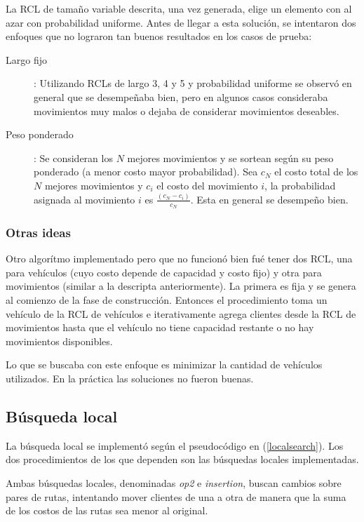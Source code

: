 \documentclass{article}
\begin{document}
  La RCL de tamaño variable descrita, una vez generada, elige un elemento con al azar con probabilidad uniforme. Antes de llegar a esta solución, se intentaron dos enfoques que no lograron tan buenos resultados en los casos de prueba:
  \begin{description}
    \item[Largo fijo]: Utilizando RCLs de largo 3, 4 y 5 y probabilidad uniforme se observó en general que se desempeñaba bien, pero en algunos casos consideraba movimientos muy malos o dejaba de considerar movimientos deseables.
    \item[Peso ponderado]: Se consideran los $N$ mejores movimientos y se sortean según su peso ponderado (a menor costo mayor probabilidad). Sea $c_N$ el costo total de los $N$ mejores movimientos y $c_i$ el costo del movimiento $i$, la probabilidad asignada al movimiento $i$ es $\frac{(c_N - c_i)}{c_N}$. Esta en general se desempeño bien.
  \end{description}

  \subsubsection*{Otras ideas}

  Otro algorítmo implementado pero que no funcionó bien fué tener dos RCL, una para vehículos (cuyo costo depende de capacidad y costo fijo) y otra para movimientos (similar a la descripta anteriormente).
  La primera es fija y se genera al comienzo de la fase de construcción. Entonces el procedimiento toma un vehículo de la RCL de vehículos e iterativamente agrega clientes desde la RCL de movimientos hasta que el vehículo no tiene capacidad restante o no hay movimientos disponibles.

  Lo que se buscaba con este enfoque es minimizar la cantidad de vehículos utilizados. En la práctica las soluciones no fueron buenas.

  \subsection*{Búsqueda local}

  La búsqueda local se implementó según el pseudocódigo en (\ref{localsearch}). Los dos procedimientos de los que dependen son las búsquedas locales implementadas.

  Ambas búsquedas locales, denominadas {\it op2} e {\it insertion}, buscan cambios sobre pares de rutas, intentando mover clientes de una a otra de manera que la suma de los costos de las rutas sea menor al original.
\end{document}
